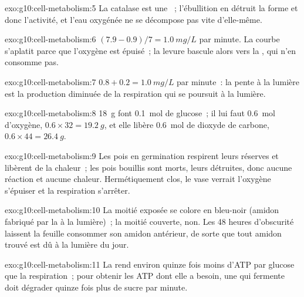 \begin{solution}{exo:g10:cell-metabolism:5}
La catalase est une ~; l'ébullition en détruit la forme et donc
l'activité, et l'eau oxygénée ne se décompose pas vite d'elle-même.
\end{solution}

\begin{solution}{exo:g10:cell-metabolism:6}
$(7.9 - 0.9)/7 = \qty{1.0}{mg/L}$ par minute. La courbe s'aplatit
parce que l'oxygène est épuisé~; la levure bascule alors vers la
, qui n'en consomme pas.
\end{solution}

\begin{solution}{exo:g10:cell-metabolism:7}
$0.8 + 0.2 = \qty{1.0}{mg/L}$ par minute~: la pente à la lumière est la
production diminuée de la respiration qui se poursuit à la lumière.
\end{solution}

\begin{solution}{exo:g10:cell-metabolism:8}
\qty{18}{g} font \qty{0.1}{mol} de glucose~; il lui faut
\qty{0.6}{mol} d'oxygène, $0.6 \times 32 = \qty{19.2}{g}$, et elle
libère \qty{0.6}{mol} de dioxyde de carbone,
$0.6 \times 44 = \qty{26.4}{g}$.
\end{solution}

\begin{solution}{exo:g10:cell-metabolism:9}
Les pois en germination respirent leurs réserves et libèrent de la
chaleur~; les pois bouillis sont morts, leurs  détruites, donc
aucune réaction et aucune chaleur. Hermétiquement clos, le vase
verrait l'oxygène s'épuiser et la respiration s'arrêter.
\end{solution}

\begin{solution}{exo:g10:cell-metabolism:10}
La moitié exposée se colore en bleu-noir (amidon fabriqué par la
 à la lumière)~; la moitié couverte, non. Les 48 heures
d'obscurité laissent la feuille consommer son amidon antérieur, de
sorte que tout amidon trouvé est dû à la lumière du jour.
\end{solution}

\begin{solution}{exo:g10:cell-metabolism:11}
La  rend environ quinze fois moins d'ATP par glucose que
la respiration~; pour obtenir les ATP dont elle a besoin, une 
qui fermente doit dégrader quinze fois plus de sucre par minute.
\end{solution}

